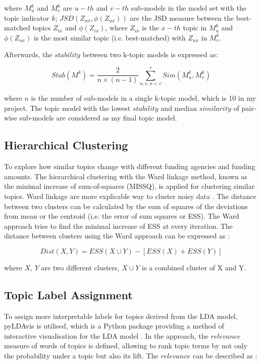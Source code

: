 where $M^k_u$ and $M^k_v$ are $u-th$ and $v-th$ sub-models in the model set with the topic indicator $k$; $JSD(Z_{ux}, \phi(Z_{ux}))$ are the JSD measure between the best-matched topics $Z_{ix}$ and $\phi(Z_{ix})$, where $Z_{ix}$ is the $x-th$ topic in $M^k_u$ and $\phi(Z_{ux})$ is the most similar topic (i.e. best-matched) with $Z_{ux}$ in $M^k_v$.

Afterwards, the $stability$ between two k-topic models is expressed as:

\begin{equation}
  Stab(M^k) = \frac{2}{n \times (n-1)} \sum^r_{u,v,u<v} Sim(M^k_u, M^k_v)
\end{equation}

where $n$ is the number of sub-models in a single k-topic model, which is 10 in my project. The topic model with the lowest $stability$ and median $similarity$ of pair-wise sub-models are considered as my final topic model.

\subsection*{Hierarchical Clustering}

To explore how similar topics change with different funding agencies and funding amounts. The hierarchical clustering with the Ward linkage method, known as the minimal increase of sum-of-squares (MISSQ), is applied for clustering similar topics. Ward linkage are more explicable way to cluster noisy data \cite{ward2}. The distance between two clusters can be calculated by the sum of squares of the deviations from mean or the centroid (i.e. the error of sum squares or ESS)\cite{ward}. The Ward approach tries to find the minimal increase of ESS at every iteration. The distance between clusters using the Ward approach can be expressed as \cite{ward2}:

\begin{equation}
  Dist(X, Y) = ESS(X \cup Y) - [ESS(X) + ESS(Y)]
\end{equation}

where $X$, $Y$ are two different clusters, $X \cup Y$ is a combined cluster of X and Y.

\subsection*{Topic Label Assignment}

To assign more interpretable labels for topics derived from the LDA model, pyLDAvis is utilised, which is a Python package providing a method of interactive visualisation for the LDA model \cite{LDAvis}. In the approach, the $relevance$ measure of words of topics is defined, allowing to rank topic terms by not only the probability under a topic but also its lift. The $relevance$ can be described as \cite{LDAvis}:

